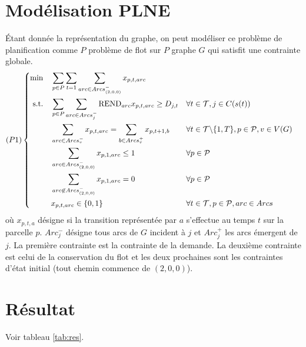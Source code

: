 \documentclass[a4paper]{article}
\begin{document}
\section{Modélisation PLNE}
Étant donnée la représentation du graphe, on peut modéliser ce problème de planification comme $P$ problème de flot sur $P$ graphe $G$ qui satisfit une contrainte globale. 
\begin{equation*}
    (P1) \left\{ 
    \begin{aligned}
    \min\quad        & \sum_{p\in P}\sum_{t=1}\sum_{arc \in Arcs^{-}_{(2,0,0)}} x_{p,t,arc}   \\
    \text{s.t.\quad} & \sum_{p\in P}\sum_{arc \in Arcs^{-}_{j}} \text{REND}_{arc} x_{p,t,arc} \geq D_{j,t} & & \forall t\in \mathcal{T}, j \in C(s(t)) \\
                     & \sum_{arc \in Arcs^{-}_{v}} x_{p,t,arc} = \sum_{b \in Arcs^{+}_{v}} x_{p,t+1,b} & & \forall t \in \mathcal{T}\backslash\{1,T\}, p \in \mathcal{P}, v\in V(G)\\
                     & \sum_{arc \in Arcs^{-}_{(2,0,0)}} x_{p,1,arc} \leq 1 & &  \forall p \in \mathcal{P} \\
                     & \sum_{arc \not\in Arcs^{-}_{(2,0,0)}} x_{p,1,arc} = 0 & &  \forall p \in \mathcal{P} \\
                     & x_{p,t,arc} \in \{0,1\} & & \forall t \in \mathcal{T}, p \in \mathcal{P}, arc \in Arcs
  \end{aligned}
\right.
\end{equation*}
où $x_{p,t,a}$ désigne si la transition représentée par $a$ s'effectue au temps $t$ sur la parcelle $p$. $Arc^{-}_{j}$ désigne tous arcs de $G$ incident à $j$ et $Arc^{+}_{j}$ les arcs émergent de $j$. La première contrainte est la contrainte de la demande. La deuxième contrainte est celui de la conservation du flot et les deux prochaines sont les contraintes d'état initial (tout chemin commence de $(2,0,0)$).

\section{Résultat}
Voir tableau \ref{tab:res}.
\begin{table}
    \centering
    \caption{Information de la solution trouvée}
    \label{tab:res}
\end{table}
\end{document}
